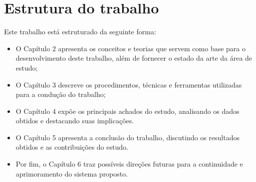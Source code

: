\section{Estrutura do trabalho}
Este trabalho está estruturado da seguinte forma:

\begin{itemize}
    \item O Capítulo 2 apresenta os conceitos e teorias que servem como base para o desenvolvimento deste trabalho, além de fornecer o estado da arte da área de estudo;
    \item O Capítulo 3 descreve os procedimentos, técnicas e ferramentas utilizadas para a condução do trabalho;
    \item O Capítulo 4 expõe os principais achados do estudo, analisando os dados obtidos e destacando suas implicações.
    \item O Capítulo 5 apresenta a conclusão do trabalho, discutindo os resultados obtidos e as contribuições do estudo.
    \item Por fim, o Capítulo 6 traz possíveis direções futuras para a continuidade e aprimoramento do sistema proposto.
\end{itemize}
